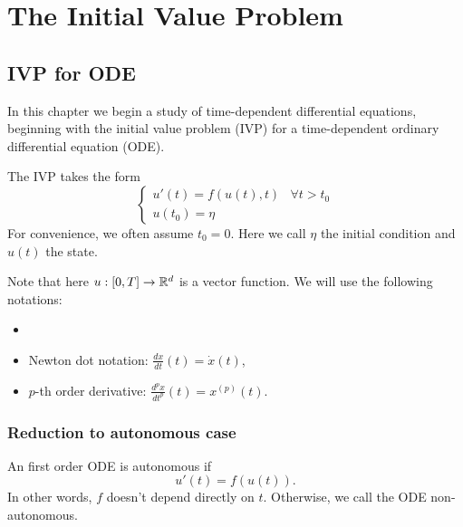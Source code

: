\part{The Initial Value Problem}
\chapter{IVP for ODE}
In this chapter we begin a study of time-dependent differential equations, beginning with the initial value problem (IVP) for a time-dependent ordinary differential equation (ODE).

\begin{problem}
\label{prob: Initial value problem}
The IVP takes the form 
\begin{equation}
\label{eq: IVP}
    \begin{cases}
        u'(t) = f(u(t),t) & \forall t>t_0 \\
        u(t_0) = \eta  & 
    \end{cases}
\end{equation}
For convenience, we often assume $ t_0=0 $. Here we call $ \eta  $ the initial condition and $ u(t) $ the state. 
\end{problem}
Note that here $ u:[0,T]\to \mathbb{R}^d $ is a vector function. We will use the following notations: 
\begin{notation}
    \begin{itemize}
        \item []
        \item Newton dot notation: $ \frac{dx}{dt} (t) = \dot x (t) $,
        \item $ p $-th order derivative: $ \frac{d^{p}x}{dt^{p}}(t) = x^{(p)}(t) $. 
    \end{itemize}
\end{notation}
 

\section{Reduction to autonomous case} 

\begin{definition}
[Autonomous]
\label{def: Autonomous}
An first order ODE is autonomous if 
\[
    u'(t) = f(u(t)).
\]
In other words, $ f $ doesn't depend directly on $ t $. Otherwise, we call the ODE non-autonomous.  
\end{definition}
 
